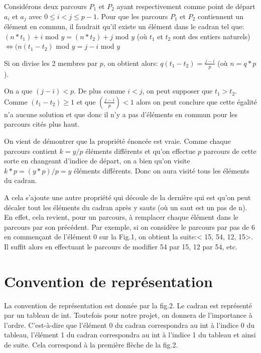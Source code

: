 \documentclass[a4paper, 12pt]{article}
\begin{document}
Considérons deux parcours $P_{1}$ et $P_{2}$ ayant respectivement comme point de départ $a_{i}$ et $a_{j}$ avec $0 \leq i < j \leq p-1$. Pour que les parcours $P_{1}$ et $P_{2}$ contiennent un élément en commun, il faudrait qu'il existe un élément dans le cadran tel que:\newline
$(n*t_{1})+i$ mod $y = (n*t_{2})+j$ mod $y$  (où $t_{1}$ et $t_{2}$ sont des entiers naturels)\newline
$\Leftrightarrow (n(t_{1} - t_{2})$ mod $y = j-i$ mod $y$ \newline

Si on divise les 2 membres par $p$, on obtient alors:\newline
$q(t_{1} - t_{2}) = \frac{j-i}{p}$  (où $n=q*p$).\newline

On a que $(j-i) < p$. De plus comme $i < j$, on peut supposer que $t_{1} > t_{2}$. Comme $(t_{1}-t_{2}) \geq 1$ et que $(\frac{j-i}{p}) < 1$ alors on peut conclure que cette égalité n'a aucune solution et que donc il n'y a pas d'éléments en commun pour les parcours cités plus haut.\newline

On vient de démontrer que la propriété énoncée est vraie. Comme chaque parcours contient $k = y/p$ éléments différents et qu'on effectue $p$ parcours de cette sorte en changeant d'indice de départ, on a bien qu'on visite $k*p = (y*p)/p = y $ éléments différents. Donc on aura visité tous les éléments du cadran. \newline

A cela s'ajoute une autre propriété qui découle de la dernière qui est qu'on peut décaler tout les éléments du cadran après y sauts (où un saut est un pas de n). En effet, cela revient, pour un parcours, à remplacer chaque élément dans le parcours par son précédent. Par exemple, si on considère le parcours par pas de 6  en commençant de l'élément 0 sur la Fig.1, on obtient la suite:< 15, 54, 12, 15>. Il suffit alors en effectuant le parcours de modifier 54 par 15, 12 par 54, etc.


\newpage
\section{Convention de représentation}

La convention de représentation est donnée par la fig.2. Le cadran est représenté par un tableau de int. Toutefois pour notre projet, on donnera de l'importance à l'ordre. C'est-à-dire que l'élément 0 du cadran correspondra au int à l'indice 0 du tableau, l'élément 1 du cadran correspondra au int à l'indice 1 du tableau et ainsi de suite. Cela correspond à la première flèche de la fig.2.
\end{document}
